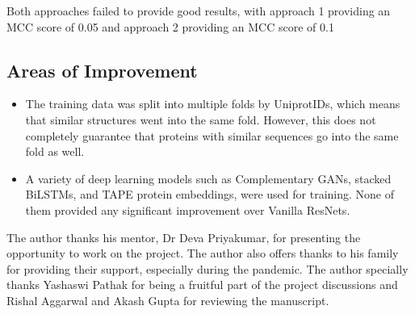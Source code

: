 \documentclass[journal=jacsat,manuscript=article]{achemso}
\begin{document}
Both approaches failed to provide good results, with approach 1 providing an MCC score of 0.05 and approach 2 providing an MCC score of 0.1

\subsection{Areas of Improvement}
\begin{itemize}
    \item The training data was split into multiple folds by UniprotIDs, which means that similar structures went into the same fold. However, this does not completely guarantee that proteins with similar sequences go into the same fold as well.
    \item A variety of deep learning models such as Complementary GANs, stacked BiLSTMs, and TAPE protein embeddings, were used for training. None of them provided any significant improvement over Vanilla ResNets.
\end{itemize}


\begin{acknowledgement}
    The author thanks his mentor, Dr Deva Priyakumar, for presenting the opportunity to work on the project. The author also offers thanks to his family for providing their support, especially during the pandemic. The author specially thanks Yashaswi Pathak for being a fruitful part of the project discussions and Rishal Aggarwal and Akash Gupta for reviewing the manuscript.

\end{acknowledgement}

\newpage

\end{document}
